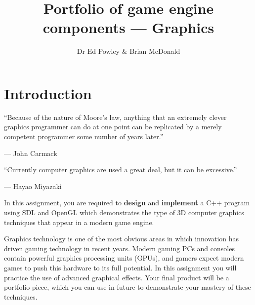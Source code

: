 \documentclass{../../fal_assignment}
\title{Portfolio of game engine components --- Graphics}
\author{Dr Ed Powley \& Brian McDonald}
\begin{document}
\maketitle

\section*{Introduction}

\begin{marginquote}
``Because of the nature of Moore's law, anything that an extremely clever graphics programmer can do at one point can be replicated by a merely competent programmer some number of years later.''

--- John Carmack

    \marginquoterule

``Currently computer graphics are used a great deal, but it can be excessive.''

--- Hayao Miyazaki
\end{marginquote}

In this assignment, you are required to \textbf{design} and \textbf{implement} a C++ program using SDL and OpenGL
which demonstrates the type of 3D computer graphics techniques that appear in a modern game engine.

Graphics technology is one of the most obvious areas in which innovation has driven gaming technology in recent years.
Modern gaming PCs and consoles contain powerful graphics processing units (GPUs),
and gamers expect modern games to push this hardware to its full potential.
In this assignment you will practice the use of advanced graphical effects.
Your final product will be a portfolio piece, which you can use in future to demonstrate your mastery of these techniques.
\end{document}
